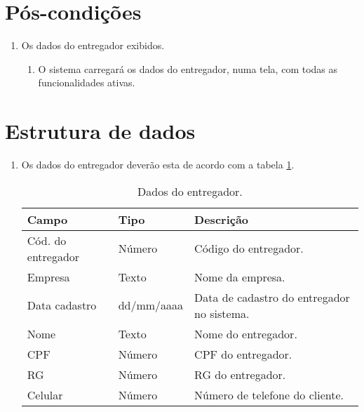 \section{Pós-condições}

\begin{enumerate}
	\item Os dados do entregador exibidos.
	\begin{enumerate}
		\item O sistema carregará os dados do entregador, numa tela, com todas as funcionalidades ativas.
	\end{enumerate}
\end{enumerate}

\section{Estrutura de dados}

\begin{enumerate}[label=ED\arabic*]
	\item Os dados do entregador deverão esta de acordo com a tabela \ref{uc016_tb_rn1}. \label{uc016_ed:1}
	\begin{table}[htb]
		\ABNTEXfontereduzida
		\caption[Dados do entregador]{Dados do entregador.}
		\label{uc016_tb_rn1}
		\begin{tabular}{|p{4.0cm}|p{3.0cm}|p{7.25cm}|}
			\hline
			\textbf{Campo}     & \textbf{Tipo} & \textbf{Descrição}                         \\ \hline
			Cód. do entregador & Número        & Código do entregador.                      \\ \hline
			Empresa            & Texto         & Nome da empresa.                           \\ \hline
			Data cadastro      & dd/mm/aaaa    & Data de cadastro do entregador no sistema. \\ \hline
			Nome               & Texto         & Nome do entregador.                        \\ \hline
			CPF                & Número        & CPF do entregador.                         \\ \hline
			RG                 & Número        & RG do entregador.                          \\ \hline
			Celular            & Número        & Número de telefone do cliente.             \\ \hline
		\end{tabular}
	\end{table}
\end{enumerate}
